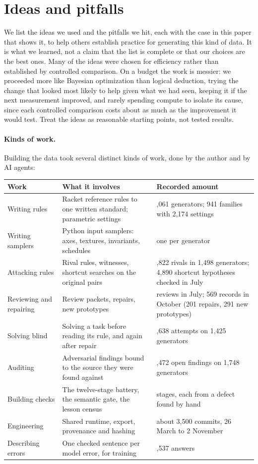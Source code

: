 \documentclass[11pt]{article}
\begin{document}
\section{Ideas and pitfalls}
\label{sec:pitfalls}

We list the ideas we used and the pitfalls we hit, each with the case in this
paper that shows it, to help others establish practice for generating this kind
of data. It is what we learned, not a claim that the list is complete or that
our choices are the best ones. Many of the ideas were chosen for efficiency
rather than established by controlled comparison. On a budget the work is
messier: we proceeded more like Bayesian optimization than logical deduction,
trying the change that looked most likely to help given what we had seen,
keeping it if the next measurement improved, and rarely spending compute to
isolate its cause, since each controlled comparison costs about as much as the
improvement it would test. Treat the ideas as reasonable starting points, not
tested results.

\paragraph{Kinds of work.} Building the data took several distinct kinds of
work, done by the author and by AI agents:
\begin{center}
\footnotesize
\begin{tabularx}{\linewidth}{>{\raggedright\arraybackslash}p{2.6cm}X>{\raggedright\arraybackslash}p{4.2cm}}
\toprule
Work & What it involves & Recorded amount \\
\midrule
Writing rules & Racket reference rules to one written standard; parametric settings & 4,061 generators; 941 families with 2,174 settings \\
Writing samplers & Python input samplers: axes, textures, invariants, schedules & one per generator \\
Attacking rules & Rival rules, witnesses, shortcut searches on the original pairs & 6,822 rivals in 1,498 generators; 4,890 shortcut hypotheses checked in July \\
Reviewing and repairing & Review packets, repairs, new prototypes & 693 reviews in July; 569 records in October (201 repairs, 291 new prototypes) \\
Solving blind & Solving a task before reading its rule, and again after repair & 2,638 attempts on 1,425 generators \\
Auditing & Adversarial findings bound to the source they were found against & 2,472 open findings on 1,748 generators \\
Building checks & The twelve-stage battery, the semantic gate, the lesson census & 12 stages, each from a defect found by hand \\
Engineering & Shared runtime, export, provenance and hashing & about 3,500 commits, 26 March to 2 November \\
Describing errors & One checked sentence per model error, for training & 17,537 answers \\
\bottomrule
\end{tabularx}
\end{center}
\end{document}
